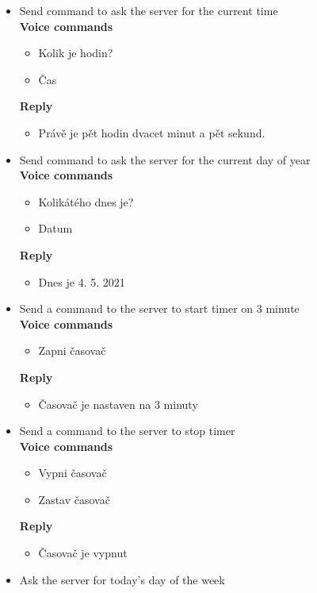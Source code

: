 \begin{itemize}
    \item Send command to ask the server for the current time\\
    \textbf{Voice commands}
    \begin{itemize}
        \item Kolik je hodin?
        \item Čas
    \end{itemize}
    \textbf{Reply}
    \begin{itemize}
        \item Právě je pět hodin dvacet minut a pět sekund.
    \end{itemize}
    \item Send command to ask the server for the current day of year\\
    \textbf{Voice commands}
    \begin{itemize}
        \item Kolikátého dnes je?
        \item Datum
    \end{itemize}
    \textbf{Reply}
    \begin{itemize}
        \item Dnes je 4. 5. 2021
    \end{itemize}
    \item Send a command to the server to start timer on 3 minute\\
    \textbf{Voice commands}
    \begin{itemize}
        \item Zapni časovač
    \end{itemize}
    \textbf{Reply}
    \begin{itemize}
        \item Časovač je nastaven na 3 minuty
    \end{itemize}
    \item Send a command to the server to stop timer\\
    \textbf{Voice commands}
    \begin{itemize}
        \item Vypni časovač
        \item Zastav časovač
    \end{itemize}
    \textbf{Reply}
    \begin{itemize}
        \item Časovač je vypnut
    \end{itemize}
    \item Ask the server for today's day of the week\\

\end{itemize}

